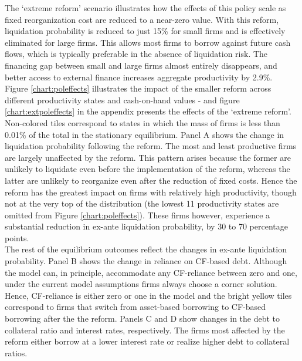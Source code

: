 \documentclass[12pt]{article}
\begin{document}
\noindent The `extreme reform' scenario illustrates how the effects of this policy scale as fixed reorganization cost are reduced to a near-zero value. With this reform, liquidation probability is reduced to just 15\% for small firms and is effectively eliminated for large firms. This allows most firms to borrow against future cash flows, which is typically preferable in the absence of liquidation risk. The financing gap between small and large firms almost entirely disappears, and better access to external finance increases aggregate productivity by 2.9\%. \vspace{3mm} \\
Figure \ref{chart:poleffects} illustrates the impact of the smaller reform across different productivity states and cash-on-hand values - and figure \ref{chart:extpoleffects} in the appendix presents the effects of the `extreme reform'. Non-colored tiles correspond to states in which the mass of firms is less than 0.01\% of the total in the stationary equilibrium. Panel A shows the change in liquidation probability following the reform. The most and least productive firms are largely unaffected by the reform. This pattern arises because the former are unlikely to liquidate even before the implementation of the reform, whereas the latter are unlikely to reorganize even after the reduction of fixed costs. Hence the reform has the greatest impact on firms with relatively high productivity, though not at the very top of the distribution (the lowest 11 productivity states are omitted from Figure \ref{chart:poleffects}). These firms however, experience a substantial reduction in ex-ante liquidation probability, by 30 to 70 percentage points. \vspace{3mm} \\
The rest of the equilibrium outcomes reflect the changes in ex-ante liquidation probability. Panel B shows the change in reliance on CF-based debt. Although the model can, in principle, accommodate any CF-reliance between zero and one, under the current model assumptions firms always choose a corner solution. Hence, CF-reliance is either zero or one in the model and the bright yellow tiles correspond to firms that switch from asset-based borrowing to CF-based borrowing after the the reform. Panels C and D show changes in the debt to collateral ratio and interest rates, respectively. The firms most affected by the reform either borrow at a lower interest rate or realize higher debt to collateral ratios. 
\end{document}
